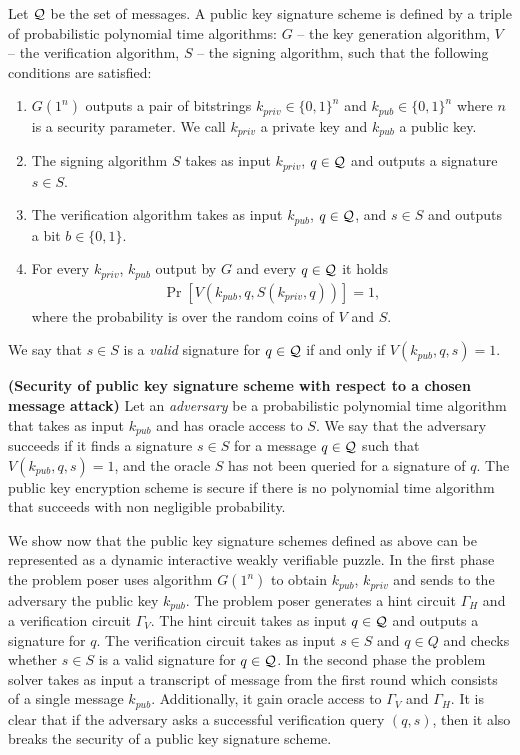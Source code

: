 \begin{definition}
Let $\mathcal{Q}$ be the set of messages. A \textnormal{public key signature scheme} is defined by a triple of probabilistic polynomial time algorithms:
$G$ -- the key generation algorithm,
$V$ -- the verification algorithm,
$S$ -- the signing algorithm,
such that the following conditions are satisfied:
\begin{enumerate}[-]
  \item $G(1^n)$ outputs a pair of bitstrings $k_{priv} \in \{0,1\}^{n}$ and $k_{pub} \in \{0,1\}^{n}$ where $n$ is a security parameter.
    We call $k_{priv}$ a private key and $k_{pub}$ a public key.
  \item The signing algorithm $S$ takes as input $k_{priv}$, $q \in \mathcal{Q}$ and outputs a signature $s \in S$.
  \item The verification algorithm takes as input $k_{pub}$, $q \in \mathcal{Q}$, and $s \in S$ and outputs a bit $b \in \{0,1\}$.
  \item For every $k_{priv}$, $k_{pub}$ output by $G$ and every $q \in \mathcal{Q}$ it holds
    \begin{align*}
      \Pr[V(k_{pub}, q, S(k_{priv}, q))] = 1,
    \end{align*}
    where the probability is over the random coins of $V$ and $S$.
\end{enumerate}
\end{definition}
We say that $s \in S$ is a \textit{valid} signature for $q \in \mathcal{Q}$ if and only if $V(k_{pub}, q, s) = 1$.
%
%
\begin{definition}\textbf{(Security of public key signature scheme with respect to a chosen message attack)}
Let an \textit{adversary} be a probabilistic polynomial time algorithm that takes as input $k_{pub}$ and has oracle access to $S$.
We say that the adversary \textnormal{succeeds} if it finds a signature $s \in S$ for a message $q \in \mathcal{Q}$ such that $V(k_{pub}, q, s) = 1$,
and the oracle $S$ has not been queried for a signature of $q$.
The public key encryption scheme is \textnormal{secure} if there is no polynomial time algorithm that succeeds with non negligible probability.
\end{definition}

We show now that the public key signature schemes defined as above can be represented as a dynamic interactive weakly verifiable puzzle.
In the first phase the problem poser uses algorithm $G(1^n)$ to obtain $k_{pub}$, $k_{priv}$ and sends to the adversary the public key $k_{pub}$.
The problem poser generates a hint circuit $\Gamma_H$ and a verification circuit $\Gamma_V$.
The hint circuit takes as input $q \in \mathcal{Q}$ and outputs a signature for $q$. The verification circuit
takes as input $s \in S$ and $q \in Q$ and checks whether $s \in S$ is a valid signature for $q \in \mathcal{Q}$.
In the second phase the problem solver takes as input a transcript of message from the first round which consists of a single message $k_{pub}$.
Additionally, it gain oracle access to $\Gamma_V$ and $\Gamma_H$.
It is clear that if the adversary asks a successful verification query $(q,s)$, then it also breaks the security of a public key signature scheme.

